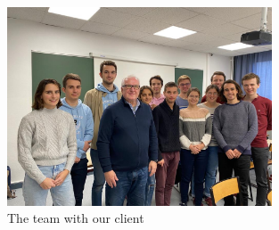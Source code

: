 \begin{figure}[H]
    \centering
    \includegraphics[width=0.7\textwidth]{Images/Members.png}
    \caption{The team with our client}
    \label{fig:Members}
\end{figure}